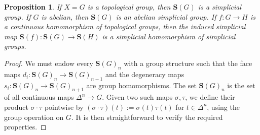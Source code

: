 \documentclass{amsart}
\newtheorem{prop}[thm]{Proposition}
\theoremstyle{definition}
\theoremstyle{remark}
\newcommand {\sS}    {\mathbf{S}}
\begin{document}
\begin{prop} \label{prop.sgissimplicialgroup}
If $X=G$ is a topological group, then $\sS (G)$ is a simplicial group.
If $G$ is abelian, then $\sS (G)$ is an abelian simplicial group.
If $f:G\to H$ is a continuous homomorphism of topological groups,
then the induced simplicial map $\sS (f): \sS (G) \to \sS (H)$
is a simplicial homomorphism of simplicial groups.
\end{prop}
\begin{proof}
We must endow every $\sS (G)_n$ with a group structure such that
the face maps $d_i: \sS (G)_n \to \sS (G)_{n-1}$ and the
degeneracy maps $s_i: \sS (G)_n \to \sS (G)_{n+1}$ are group
homomorphisms.
The set $\sS (G)_n$ is the set of all continuous maps
$\Delta^n \to G$. Given two such maps $\sigma, \tau$, we
define their product $\sigma \cdot \tau$ pointwise by
$(\sigma \cdot \tau)(t) := \sigma (t) \tau (t)$ for $t\in \Delta^n$,
using the group operation on $G$.
It is then straightforward to verify the required properties.
\end{proof}
\end{document}
